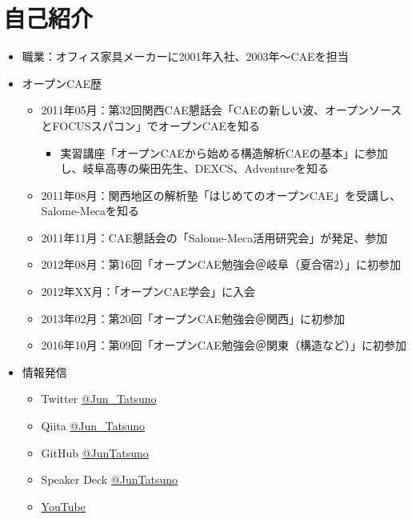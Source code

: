 \section{自己紹介}
\begin{itemize}
	\item 職業：オフィス家具メーカーに2001年入社、2003年～CAEを担当
	\item オープンCAE歴
	      \begin{itemize}
		      \item 2011年05月：第32回関西CAE懇話会「CAEの新しい波、オープンソースとFOCUSスパコン」でオープンCAEを知る
		            \begin{itemize}
			            \item 実習講座「オープンCAEから始める構造解析CAEの基本」に参加し、岐阜高専の柴田先生、DEXCS、Adventureを知る
		            \end{itemize}
		      \item 2011年08月：関西地区の解析塾「はじめてのオープンCAE」を受講し、Salome-Mecaを知る
		      \item 2011年11月：CAE懇話会の「Salome-Meca活用研究会」が発足、参加
		      \item 2012年08月：第16回「オープンCAE勉強会＠岐阜（夏合宿2）」に初参加
		      \item 2012年XX月：「オープンCAE学会」に入会
		      \item 2013年02月：第20回「オープンCAE勉強会＠関西」に初参加
		      \item 2016年10月：第09回「オープンCAE勉強会＠関東（構造など）」に初参加
	      \end{itemize}
	\item 情報発信
	      \begin{itemize}
		      \item Twitter \href{https://twitter.com/Jun_Tatsuno}{@Jun\_Tatsuno}
		      \item Qiita \href{https://qiita.com/Jun_Tatsuno}{@Jun\_Tatsuno}
		      \item GitHub \href{https://github.com/JunTatsuno/}{@JunTatsuno}
		      \item Speaker Deck \href{https://speakerdeck.com/juntatsuno/}{@JunTatsuno}
		      \item \href{https://www.youtube.com/playlist?list=PL3Ey4GcIvUy-2_ZMZ7dG_Wez4H__rin5c}{YouTube}
	      \end{itemize}
\end{itemize}
